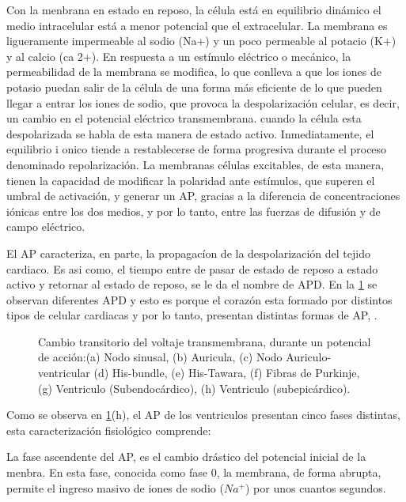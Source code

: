 Con la menbrana en estado en reposo, la célula está en equilibrio dinámico el
medio intracelular está a menor potencial que el extracelular. La membrana es
 ligueramente impermeable al sodio (Na+) y un poco permeable al potacio  (K+) y
 al calcio (ca 2+). En respuesta a un estímulo eléctrico o mecánico, la
 permeabilidad de la membrana se modifica, lo que conlleva a que los iones de
 potasio puedan salir de la célula de una forma más eficiente de lo que pueden
 llegar a entrar los iones de sodio, que provoca la despolarización celular, es
 decir, un cambio en el potencial eléctrico transmembrana. cuando la célula esta
 despolarizada se habla de esta manera de estado activo. Inmediatamente, el
 equilibrio i onico tiende a restablecerse de forma progresiva durante el
 proceso denominado repolarización.
 La membranas células excitables, de esta manera, tienen la capacidad de
 modificar la polaridad ante estímulos, que superen el umbral de activación, y
 generar un \ac{AP}, gracias a la diferencia de concentraciones iónicas entre
 los dos medios, y por lo tanto, entre las fuerzas de difusión  y de campo eléctrico.

El \ac{AP} caracteriza, en parte, la propagacíon de la despolarización del
tejido cardiaco. Es asi como, el tiempo entre de pasar de estado de reposo a
estado activo  y retornar al estado de reposo, se le da el nombre de
\ac{APD}. En  la \ref{fig:apds} se observan diferentes \ac{APD} y esto es porque
el corazón esta formado por distintos tipos de celular cardiacas y por lo
tanto, presentan distintas formas de \ac{AP}, \cite{dawodu1996, Malmivuo95,
Sachse04}.



\begin{figure}[t]
\centering
\caption{Cambio transitorio del voltaje transmembrana, durante un potencial de
acción:(a) Nodo sinusal, (b) Auricula, (c) Nodo Auriculo-ventricular (d)
His-bundle,  (e) His-Tawara, (f) Fibras de Purkinje, (g)
Ventriculo (Subendocárdico), (h) Ventriculo (subepicárdico). }
  \label{fig:apds}
\end{figure}


Como se observa en \ref{fig:apds}(h), el \ac{AP} de los ventriculos  presentan
cinco fases distintas, esta caracterización fisiológico comprende:

La fase ascendente del \ac{AP}, es el cambio drástico del potencial inicial de
la menbra. En esta fase, conocida como fase 0, la membrana,  de forma
abrupta, permite el ingreso masivo de iones de sodio ($Na^+$) por unos cuantos
segundos.

